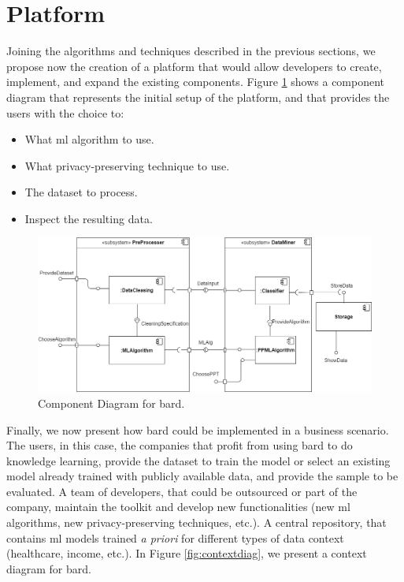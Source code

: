 
\section{Platform}
\label{sec:components}

Joining the algorithms and techniques described in the previous sections, we propose now the creation of a platform that would allow developers to create, implement, and expand the existing components. Figure \ref{fig:compdiag} shows a component diagram that represents the initial setup of the platform, and that provides the users with the choice to:

\begin{itemize}
	\item What \ac{ml} algorithm to use.
	\item What privacy-preserving technique to use.
	\item The dataset to process.
	\item Inspect the resulting data.
\end{itemize}

\begin{figure}[ht]
  \centerline{\includegraphics[width=1.1\textwidth]{images/CompDiagram.png}}
  \caption{Component Diagram for \acs{bard}.}
  \label{fig:compdiag}
\end{figure} 


Finally, we now present how \acs{bard} could be implemented in a business scenario. The users, in this case, the companies that profit from using \acs{bard} to do knowledge learning, provide the dataset to train the model or select an existing model already trained with publicly available data, and provide the sample to be evaluated. A team of developers, that could be outsourced or part of the company, maintain the toolkit and develop new functionalities (new \ac{ml} algorithms, new privacy-preserving techniques, etc.). A central repository, that contains \ac{ml} models trained \textit{a priori} for different types of data context (healthcare, income, etc.). In Figure \ref{fig:contextdiag}, we present a context diagram for \acs{bard}.


